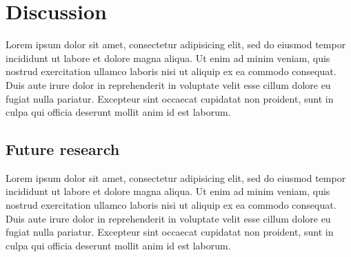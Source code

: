 \documentclass{sigchi}
\begin{document}
\section{Discussion}

Lorem ipsum dolor sit amet, consectetur adipisicing elit, sed do eiusmod tempor incididunt ut labore et dolore magna aliqua. Ut enim ad minim veniam, quis nostrud exercitation ullamco laboris nisi ut aliquip ex ea commodo consequat. Duis aute irure dolor in reprehenderit in voluptate velit esse cillum dolore eu fugiat nulla pariatur. Excepteur sint occaecat cupidatat non proident, sunt in culpa qui officia deserunt mollit anim id est laborum.

\subsection{Future research}

Lorem ipsum dolor sit amet, consectetur adipisicing elit, sed do eiusmod tempor incididunt ut labore et dolore magna aliqua. Ut enim ad minim veniam, quis nostrud exercitation ullamco laboris nisi ut aliquip ex ea commodo consequat. Duis aute irure dolor in reprehenderit in voluptate velit esse cillum dolore eu fugiat nulla pariatur. Excepteur sint occaecat cupidatat non proident, sunt in culpa qui officia deserunt mollit anim id est laborum.

\balance{}



\end{document}
